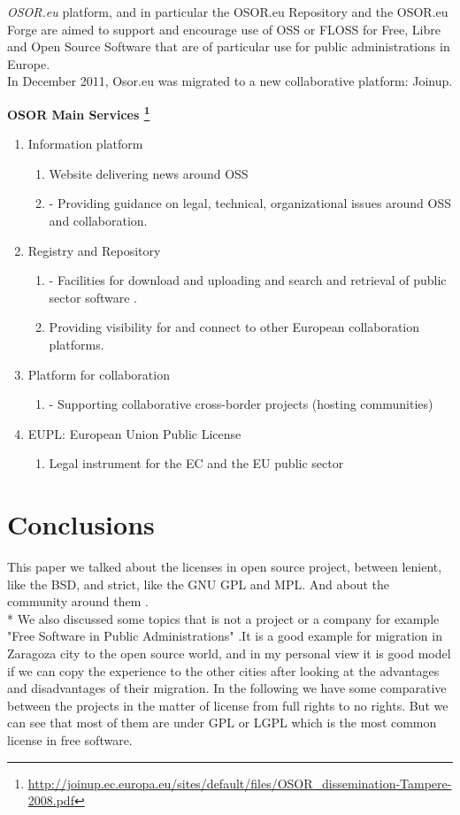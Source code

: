\documentclass[11pt]{article} %
\begin{document}
\emph{OSOR.eu} platform, and in particular the OSOR.eu Repository and the OSOR.eu Forge are aimed to support and encourage use of OSS or FLOSS for Free, Libre and Open Source Software that are of particular use for public administrations in Europe. \\
In December 2011, Osor.eu was migrated to a new collaborative platform: Joinup.

{\bf OSOR Main Services \footnote {\url{http://joinup.ec.europa.eu/sites/default/files/OSOR_dissemination-Tampere-2008.pdf}}}

\begin{enumerate}
   \item Information platform
  \begin{enumerate}
		\item Website delivering news around OSS
		 \item -  Providing guidance on legal, technical, organizational issues around OSS and collaboration.
	\end {enumerate}
   \item Registry and Repository
	\begin{enumerate}
		\item -  Facilities for download and uploading and search and retrieval of public sector software .
		\item Providing visibility for and connect to other European collaboration platforms.
	\end {enumerate}
   \item  Platform for collaboration 
	\begin{enumerate}
		\item - Supporting collaborative cross-border projects (hosting communities)
	\end {enumerate}
  \item EUPL: European Union Public License
	\begin{enumerate}
		\item Legal instrument for the EC and the EU public sector
	\end{enumerate}
\end {enumerate}
\newpage
\section{Conclusions}
This paper we talked about the licenses in open source project, between lenient, like the BSD, and strict, like the GNU GPL and MPL.
And about the community around them .\\* 
We also discussed  some topics that is not a project or a company  for example "Free Software in Public Administrations" .It is  a good example for migration in Zaragoza city to the open source world, and in my personal view it is  good  model  if we can  copy the experience to the other cities after looking at the advantages and disadvantages of their migration.
In the following we have some comparative between the projects in the matter of license from  full rights to no rights.
But we can see that most of them are under GPL or LGPL which is the most common license in free software.
\end{document}
